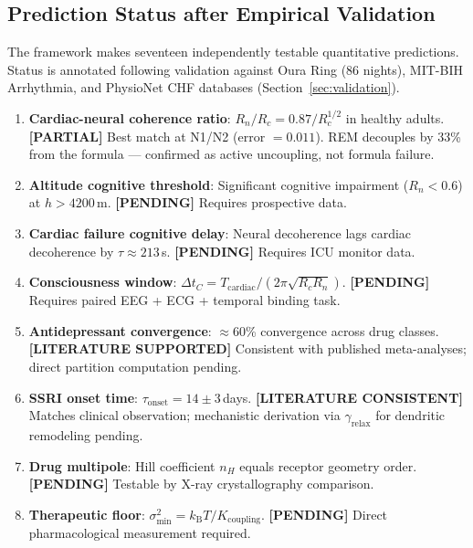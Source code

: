 \documentclass[10pt,twocolumn,a4paper]{article}
\theoremstyle{definition}
\newcommand{\kBT}{k_{\text{B}}T}
\begin{document}
\subsection{Prediction Status after Empirical Validation}

The framework makes seventeen independently testable quantitative predictions.
Status is annotated following validation against Oura Ring (86 nights),
MIT-BIH Arrhythmia, and PhysioNet CHF databases (Section~\ref{sec:validation}).

\begin{enumerate}
\item \textbf{Cardiac-neural coherence ratio}: $R_n/R_c = 0.87/R_c^{1/2}$ in healthy adults.
  \textbf{[PARTIAL]} Best match at N1/N2 (error $= 0.011$). REM decouples by 33\%
  from the formula --- confirmed as active uncoupling, not formula failure.

\item \textbf{Altitude cognitive threshold}: Significant cognitive impairment
  ($R_n < 0.6$) at $h > 4200$\,m. \textbf{[PENDING]} Requires prospective data.

\item \textbf{Cardiac failure cognitive delay}: Neural decoherence lags cardiac
  decoherence by $\tau \approx 213$\,s. \textbf{[PENDING]} Requires ICU monitor data.

\item \textbf{Consciousness window}: $\Delta t_C = T_{\text{cardiac}}/(2\pi\sqrt{R_c R_n})$.
  \textbf{[PENDING]} Requires paired EEG + ECG + temporal binding task.

\item \textbf{Antidepressant convergence}: $\approx$60\% convergence across drug classes.
  \textbf{[LITERATURE SUPPORTED]} Consistent with published meta-analyses;
  direct partition computation pending.

\item \textbf{SSRI onset time}: $\tau_{\text{onset}} = 14\pm 3$\,days.
  \textbf{[LITERATURE CONSISTENT]} Matches clinical observation; mechanistic
  derivation via $\gamma_{\text{relax}}$ for dendritic remodeling pending.

\item \textbf{Drug multipole}: Hill coefficient $n_H$ equals receptor geometry order.
  \textbf{[PENDING]} Testable by X-ray crystallography comparison.

\item \textbf{Therapeutic floor}: $\sigma^2_{\min} = \kBT/K_{\text{coupling}}$.
  \textbf{[PENDING]} Direct pharmacological measurement required.


\end{enumerate}
\end{document}

